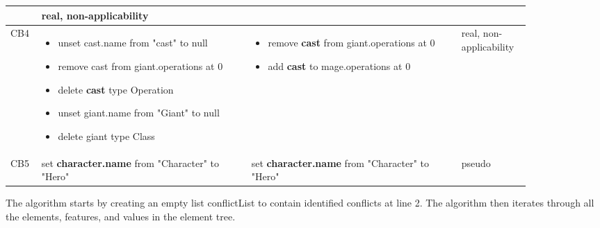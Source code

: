 \begin{table*}[ht]
\begin{scriptsize}
\begin{tabular}{|p{0.04\linewidth}|p{0.36\linewidth}|p{0.36\linewidth}|
        p{0.11\linewidth}|}
      &
      real, non-applicability\\
      \hline
      CB4 &
      \begin{minipage}[t]{\linewidth}
        \raggedright
        \begin{itemize}[leftmargin=0pt]
          \setlength
          \item[] unset cast.name from "cast" to null
          \item[] remove cast from giant.operations at 0
          \item[] delete \textbf{cast} type Operation
          \item[] unset giant.name from "Giant" to null
          \item[] delete giant type Class
        \end{itemize}
      \end{minipage}
      &
      \begin{minipage}[t]{\linewidth}
        \raggedright
        \begin{itemize}[leftmargin=0pt]
          \setlength
          \item[] remove \textbf{cast} from giant.operations at 0
          \item[] add \textbf{cast} to mage.operations at 0
        \end{itemize}
      \end{minipage}
      &
      real, non-applicability\\
      \hline
      CB5 &
      set \textbf{character.name} from "Character" to "Hero" &
      set \textbf{character.name} from "Character" to "Hero" &
      pseudo\\
      \hline
    \end{tabular}
  \end{scriptsize}
\end{table*}

The algorithm starts by creating an empty list \textsf{conflictList} to contain identified conflicts at line 2. The algorithm then iterates through all the elements, features, and values in the element tree.

